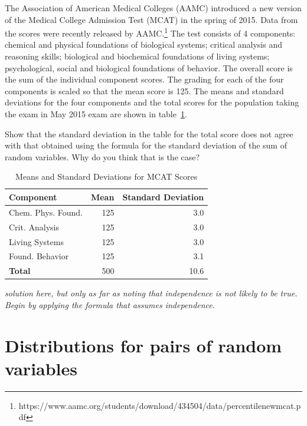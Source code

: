 \begin{exercise}  The Association of American Medical Colleges (AAMC) introduced a new version of the Medical College Admission Test (MCAT) in the spring of 2015. Data from the scores were recently released by AAMC.\footnote{https://www.aamc.org/students/download/434504/data/percentilenewmcat.pdf}  The test consists of 4 components: chemical and physical foundations of biological systems; critical analysis and reasoning skills; biological and biochemical foundations of living systems; psychological, social and biological foundations of behavior. The overall score is the sum of the individual component scores. The grading for each of the four components is scaled so that the mean score is 125.  The means and standard deviations for the four components and the total scores for the population taking the exam in May 2015 exam are shown in table~\ref{table:mcatScoreDistribution}.
	
Show that the standard deviation in the table for the total score does not agree with that obtained using the formula for the standard deviation of the sum of random variables.  Why do you think that is the case?

	\begin{table}[h]
		\centering
		\begin{tabular}{lrr}
			\hline
			\textbf{Component} & \textbf{Mean} & \textbf{Standard Deviation}\\
			\hline
			             Chem. Phys. Found. &   125 &   3.0\\
			             Crit. Analysis &   125 &    3.0 \\
			             Living  Systems &  125 &     3.0\\
			             Found. Behavior&   125 &     3.1\\
			             \textbf{Total} &    500 &     10.6\\
			\hline
		\end{tabular}
		\caption{Means and Standard Deviations for MCAT Scores}
		\label{table:mcatScoreDistribution}
	\end{table}	
\end{exercise}

\textit{solution here, but only as far as noting that independence is not likely to be true.  Begin by applying the formula that assumes independence.}

\section{Distributions for pairs of random variables}

